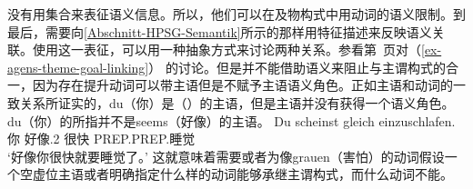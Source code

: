 \citet{MR2001a} 没有用集合来表征语义信息。所以，他们可以在及物构式中用动词的语义限制。到最后，需要向\ref{Abschnitt-HPSG-Semantik}所示的那样用特征描述来反映语义关联。使用这一表征，可以用一种抽象方式来讨论两种关系。参看第~\pageref{ex-agens-theme-goal-linking}页对（\ref{ex-agens-theme-goal-linking}） 的讨论。但是并不能借助语义来阻止与主谓构式的合一，因为存在提升动词可以带主语但是不赋予主语语义角色。正如主语和动词的一致关系所证实的，du（你）是（）的主语，但是主语并没有获得一个语义角色。du（你）的所指并不是seems（好像）的主语。
\ea
\gll Du scheinst gleich einzuschlafen.\\
     你 好像.2\sg{} 很快 PREP.PREP.睡觉\\
\glt `好像你很快就要睡觉了。'
\z
这就意味着需要或者为像grauen（害怕）的动词假设一个空虚位主语或者明确指定什么样的动词能够承继主谓构式，而什么动词不能。

